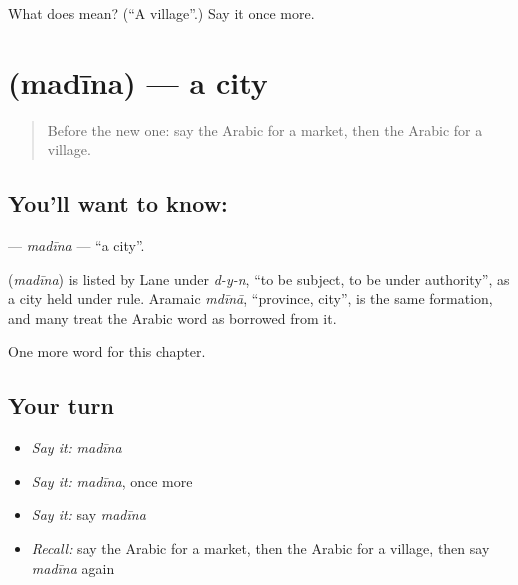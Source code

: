 \begin{tcolorbox}[breakable,colback=teal!4,colframe=teal!35!black,title={Before you move on}]
What does  mean? (\textquotedblleft{}A village\textquotedblright{}.) Say it once more.
\end{tcolorbox}
\section[\texorpdfstring{\ar{مدينة} (madīna)}{مدينة (madīna)}]{ (madīna) — a city}

\label{lesson:AR-C93-madina}



\begin{quote}
Before the new one: say the Arabic for a market, then the Arabic for a village.
\end{quote}

\subsection*{You'll want to know: }
\textbf{} — \emph{madīna} — \textquotedblleft{}a city\textquotedblright{}.

\begin{cousinweb}
\textbf{} (\emph{madīna}) is listed by Lane under \emph{d-y-n}, \textquotedblleft{}to be subject, to be under authority\textquotedblright{}, as a city held under rule. Aramaic \emph{mdīnā}, \textquotedblleft{}province, city\textquotedblright{}, is the same formation, and many treat the Arabic word as borrowed from it.
\end{cousinweb}

\begin{grammarlens}[title={What you've built}]
One more word for this chapter.
\end{grammarlens}

\subsection*{Your turn}
\begin{itemize}
\raggedright
  \item \emph{Say it:} \emph{madīna}
  \item \emph{Say it:} \emph{madīna}, once more
  \item \emph{Say it:} say \emph{madīna}
  \item \emph{Recall:} say the Arabic for a market, then the Arabic for a village, then say \emph{madīna} again
\end{itemize}

